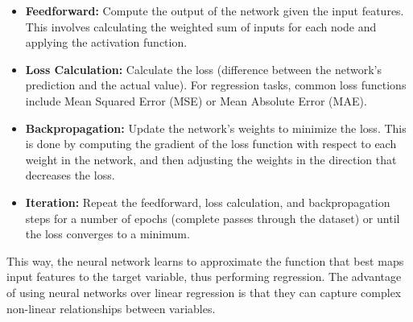 \begin{itemize}
\item \textbf{Feedforward:} Compute the output of the network given
  the input features. This involves calculating the weighted sum of
  inputs for each node and applying the activation function.

\item \textbf{Loss Calculation:} Calculate the loss (difference
  between the network's prediction and the actual value). For
  regression tasks, common loss functions include Mean Squared Error
  (MSE) or Mean Absolute Error (MAE).

\item \textbf{Backpropagation:} Update the network's weights to
  minimize the loss. This is done by computing the gradient of the
  loss function with respect to each weight in the network, and then
  adjusting the weights in the direction that decreases the loss.

\item \textbf{Iteration:} Repeat the feedforward, loss calculation,
  and backpropagation steps for a number of epochs (complete passes
  through the dataset) or until the loss converges to a minimum.

\end{itemize}

This way, the neural network learns to approximate the function that
best maps input features to the target variable, thus performing
regression. The advantage of using neural networks over linear
regression is that they can capture complex non-linear relationships
between variables.
